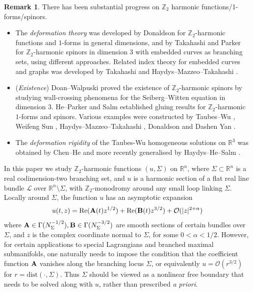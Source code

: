 \documentclass[11pt,a4paper]{article}
\numberwithin{equation}{section}%
\theoremstyle{definition}
\newtheorem{rmk}[thm]{Remark}
\newcommand{\R}{\mathbb{R}}
\newcommand{\Z}{\mathbb{Z}}
\begin{document}
\begin{rmk}
There has been substantial progress on $\Z_2$ harmonic functions/1-forms/spinors.
\begin{itemize}
    \item The \emph{deformation theory} was developed by Donaldson \cite{Donaldson-Deformation} for $\Z_2$-harmonic functions and $1$-forms in general dimensions, and by Takahashi \cite{Takahashi-Moduli} and Parker \cite{Parker-Deformation}  for $\Z_2$-harmonic spinors in dimension $3$ with embedded curves as branching sets, using different approaches. Related index theory for embedded curves and graphs was developed by Takahashi \cite{Takahashi-Index} and Haydys--Mazzeo--Takahashi \cite{Haydys-Mazzeo-Takahashi-IndexGraph}. 

    
    \item (\emph{Existence}) Doan--Walpuski \cite{Doan-Walpuski} proved the existence of $\Z_2$-harmonic spinors by studying wall-crossing phenomena for the Seiberg--Witten equation in dimension $3$. He--Parker \cite{He-Parker} and Salm \cite{Salm} established gluing results for $\Z_2$-harmonic $1$-forms and spinors. Various examples were constructed by Taubes--Wu \cite{Taubes-Wu}, Weifeng Sun \cite{Sun-Pell}, Haydys--Mazzeo--Takahashi \cite{Haydys-Mazzeo-Takahashi-Examples}, Donaldson \cite{Donaldson-Twistor} and Dashen Yan \cite{Yan-Construction}. 
    \item The \emph{deformation rigidity} of the Taubes-Wu homogeneous solutions on $\R^3$  was obtained by Chen--He \cite{Chen-He} and more recently generalised by Haydys--He--Salm \cite{Haydys-He-Salm}. 
\end{itemize}
\end{rmk}







In this paper we study $\Z_2$-harmonic functions $(u, \Sigma)$ on $\R^n$, where $\Sigma\subset \R^n$ is a real codimension-two branching set, and $u$ is a harmonic section of a flat real line bundle $\mathcal{L}$ over $\R^n\setminus\Sigma$, with $\Z_2$-monodromy around any small loop linking $\Sigma$. Locally around $\Sigma$, the function $u$ has an asymptotic expansion
\[
 u(t,z)=\operatorname{Re}({\bf{A}}(t)z^{1/2})+\operatorname{Re}({\bf{B}}(t)z^{3/2})+\mathcal{O}(|z|^{2+\alpha})
\]
where ${\bf{A}}\in \Gamma(N_\Sigma^{-1/2}),{\bf{B}}\in \Gamma(N_\Sigma^{-3/2})$ are smooth sections of certain bundles over $\Sigma$, and $z$ is the complex coordinate normal to $\Sigma$, for some $0<\alpha<1/2$. However, for certain applications to special Lagrangians and branched maximal submanifolds, one naturally needs to impose the condition that the coefficient function $\bf{A}$ vanishes along the branching locus $\Sigma$, or equivalently $u=\mathcal{O}(r^{3/2})$ for $r=\text{dist}(\cdot, \Sigma)$. Thus $\Sigma$ should be viewed as a nonlinear free boundary that needs to be solved along with $u$, rather than prescribed \textit{a priori}.
\end{document}
